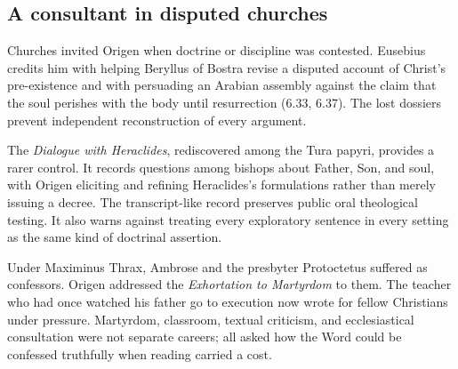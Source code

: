 \subsection{A consultant in disputed churches}

Churches invited Origen when doctrine or discipline was contested. Eusebius
credits him with helping Beryllus of Bostra revise a disputed account of
Christ's pre-existence and with persuading an Arabian assembly against the
claim that the soul perishes with the body until resurrection (6.33, 6.37).
The lost dossiers prevent independent reconstruction of every argument.

The \emph{Dialogue with Heraclides}, rediscovered among the Tura papyri,
provides a rarer control. It records questions among bishops about Father, Son,
and soul, with Origen eliciting and refining Heraclides's formulations rather
than merely issuing a decree. The transcript-like record preserves public oral
theological testing. It also warns against treating every exploratory sentence in
every setting as the same kind of doctrinal assertion.

Under Maximinus Thrax, Ambrose and the presbyter Protoctetus suffered as
confessors. Origen addressed the \emph{Exhortation to Martyrdom} to them. The
teacher who had once watched his father go to execution now wrote for fellow
Christians under pressure. Martyrdom, classroom, textual criticism, and
ecclesiastical consultation were not separate careers; all asked how the Word
could be confessed truthfully when reading carried a cost.
